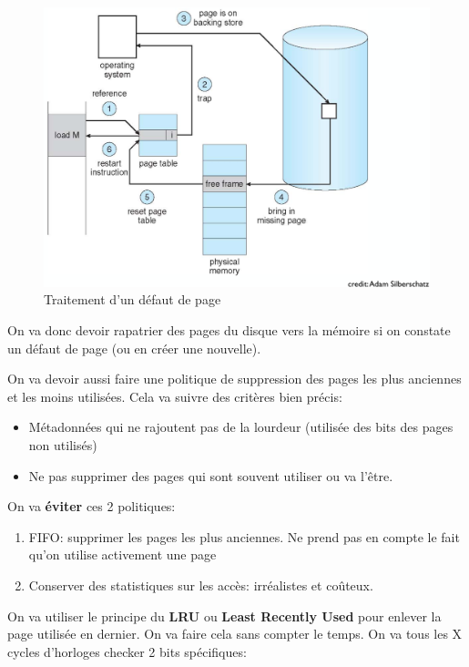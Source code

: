 \begin{figure}
\centering
\includegraphics{image-58.png}
\caption{Traitement d'un défaut de page}
\end{figure}

On va donc devoir rapatrier des pages du disque vers la mémoire si on
constate un défaut de page (ou en créer une nouvelle).

On va devoir aussi faire une politique de suppression des pages les plus
anciennes et les moins utilisées. Cela va suivre des critères bien
précis:

\begin{itemize}
\tightlist
\item
  Métadonnées qui ne rajoutent pas de la lourdeur (utilisée des bits des
  pages non utilisés)
\item
  Ne pas supprimer des pages qui sont souvent utiliser ou va l'être.
\end{itemize}

On va \textbf{éviter} ces 2 politiques:

\begin{enumerate}
\def\labelenumi{\arabic{enumi}.}
\tightlist
\item
  FIFO: supprimer les pages les plus anciennes. Ne prend pas en compte
  le fait qu'on utilise activement une page
\item
  Conserver des statistiques sur les accès: irréalistes et coûteux.
\end{enumerate}

On va utiliser le principe du \textbf{LRU} ou \textbf{Least Recently
Used} pour enlever la page utilisée en dernier. On va faire cela sans
compter le temps. On va tous les X cycles d'horloges checker 2 bits
spécifiques:

